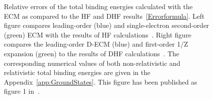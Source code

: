 \begin{figure}
       \centering  
 \caption{Relative errors of the total binding energies calculated with the ECM as compared to the HF and DHF results~\eqref{Errorformula}. Left figure compares leading-order (blue) and single-electron second-order (green) ECM with the results of HF calculations~\cite{Saito2009836}. Right figure compares the leading-order D-ECM (blue) and first-order 1/Z expansion (green) to the results of DHF calculations~\cite{DESCLAUX1973311}. The corresponding numerical values of both non-relativistic and relativistic total binding energies are given in the Appendix~\ref{app:GroundStates}. This figure has been published as figure 1 in~\cite{Dzikowski_2021}.} \label{ErrorComparisonFigure}
\label{fig:my_label}
  \end{figure}

